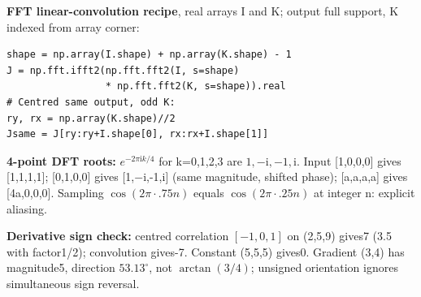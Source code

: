 \documentclass[a4paper]{article}
\newcommand{\key}[1]{\textbf{#1}}
\newcommand{\ii}{\mathrm i}
\newcounter{sheet}
\newcounter{sheetcolumn}
\newlength{\colwidth}
\newcommand{\EndSheet}{\unskip\egroup\par}
\newenvironment{sheetcol}[1][7.0]{\stepcounter{sheetcolumn}
  \begin{lrbox}{\columnbox}\begin{minipage}[t]{\colwidth}\vspace{0pt}
  \fontsize{#1}{\dimexpr#1pt+0.6pt\relax}\selectfont}
  {\end{minipage}\end{lrbox}
  \typeout{CV1COL|\thesheet|\thesheetcolumn|\the\dimexpr\ht\columnbox+\dp\columnbox\relax}
  \usebox{\columnbox}\ignorespacesafterend}
\begin{document}
\begin{sheetcol}[6.75]
\key{FFT linear-convolution recipe}, real arrays I and K; output full support, K indexed from array corner:
\begin{lstlisting}
shape = np.array(I.shape) + np.array(K.shape) - 1
J = np.fft.ifft2(np.fft.fft2(I, s=shape)
                 * np.fft.fft2(K, s=shape)).real
# Centred same output, odd K:
ry, rx = np.array(K.shape)//2
Jsame = J[ry:ry+I.shape[0], rx:rx+I.shape[1]]
\end{lstlisting}
\key{4-point DFT roots:} \(e^{-2\pi\ii k/4}\) for k=0,1,2,3 are \(1,-\ii,-1,\ii\). Input [1,0,0,0] gives [1,1,1,1]; [0,1,0,0] gives [1,\(-\ii\),-1,\(\ii\)] (same magnitude, shifted phase); [a,a,a,a] gives [4a,0,0,0]. Sampling \(\cos(2\pi\cdot .75n)\) equals \(\cos(2\pi\cdot .25n)\) at integer n: explicit aliasing.

\key{Derivative sign check:} centred correlation \([-1,0,1]\) on (2,5,9) gives7 (3.5 with factor1/2); convolution gives-7. Constant (5,5,5) gives0. Gradient (3,4) has magnitude5, direction \(53.13^\circ\), not \(\arctan(3/4)\); unsigned orientation ignores simultaneous sign reversal.
\end{sheetcol}\EndSheet
\end{document}
